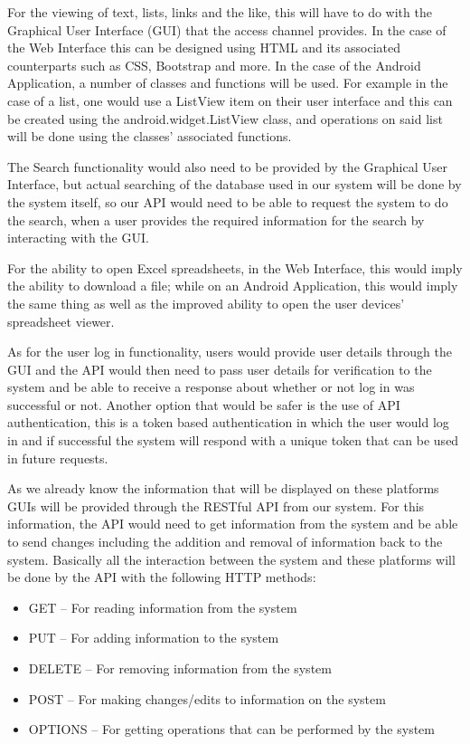 \documentclass[a4paper,12pt]{article}
\begin{document}
For the viewing of text, lists, links and the like, this will have to do with the Graphical User Interface (GUI) that the access channel provides. In the case of the Web Interface this can be designed using HTML and its associated counterparts such as CSS, Bootstrap and more. In the case of the Android Application, a number of classes and functions will be used. For example in the case of a list, one would use a ListView item on their user interface and this can be created using the android.widget.ListView class, and operations on said list will be done using the classes' associated functions.

The Search functionality would also need to be provided by the Graphical User Interface, but actual searching of the database used in our system will be done by the system itself, so our API would need to be able to request the system to do the search, when a user provides the required information for the search by interacting with the GUI.

For the ability to open Excel spreadsheets, in the Web Interface, this would imply the ability to download a file; while on an Android Application, this would imply the same thing as well as the improved ability to open the user devices' spreadsheet viewer.

As for the user log in functionality, users would provide user details through the GUI and the API would then need to pass user details for verification to the system and be able to receive a response about whether or not log in was successful or not. Another option that would be safer is the use of API authentication, this is a token based authentication in which the user would log in and if successful the system will respond with a unique token that can be used in future requests.

As we already know the information that will be displayed on these platforms GUIs will be provided through the RESTful API from our system. For this information, the API would need to get information from the system and be able to send changes including the addition and removal of information back to the system. Basically all the interaction between the system and these platforms will be done by the API with the following HTTP methods:
\begin{itemize}
	\item GET – For reading information from the system
	\item PUT – For adding information to the system
	\item DELETE – For removing information from the system
	\item POST – For making changes/edits to information on the system
	\item OPTIONS – For getting operations that can be performed by the system
\end{itemize}
\end{document}
